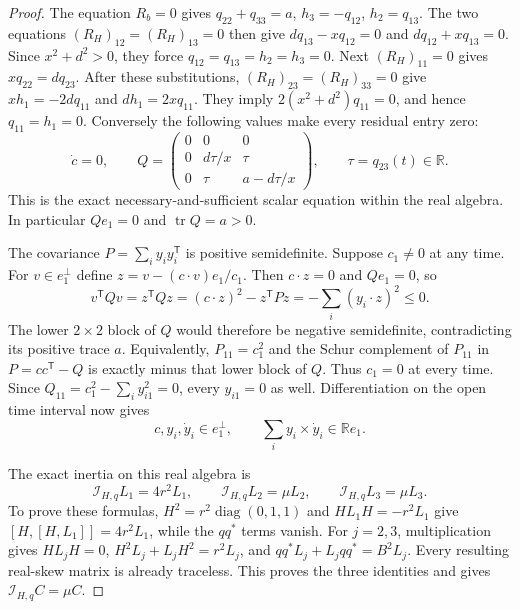 \begin{proof}
The equation $R_b=0$ gives $q_{22}+q_{33}=a$, $h_3=-q_{12}$,
$h_2=q_{13}$. The two equations $(R_H)_{12}=(R_H)_{13}=0$ then give
$dq_{13}-xq_{12}=0$ and $dq_{12}+xq_{13}=0$.
Since $x^2+d^2>0$, they force
$q_{12}=q_{13}=h_2=h_3=0$.
Next $(R_H)_{11}=0$ gives $xq_{22}=dq_{23}$.
After these substitutions, $(R_H)_{23}=(R_H)_{33}=0$ give
$xh_1=-2dq_{11}$ and $dh_1=2xq_{11}$.
They imply $2(x^2+d^2)q_{11}=0$, and hence $q_{11}=h_1=0$.
Conversely the following values make every residual entry zero:
\begin{equation}\label{q444:real-scalar-covariance}
 \dot c=0,\qquad Q=
 \begin{pmatrix}0&0&0\\0&d\tau/x&\tau\\0&\tau&a-d\tau/x\end{pmatrix},
 \qquad \tau=q_{23}(t)\in\mathbb R.
\end{equation}
This is the exact necessary-and-sufficient scalar equation within the
real algebra. In particular $Qe_1=0$ and $\operatorname{tr}Q=a>0$.

The covariance $P=\sum_i y_iy_i^{\mathsf T}$ is positive semidefinite.
Suppose $c_1\ne0$ at any time. For $v\in e_1^\perp$ define
$z=v-(c\cdot v)e_1/c_1$. Then $c\cdot z=0$ and $Qe_1=0$, so
\[
 v^{\mathsf T}Qv=z^{\mathsf T}Qz
 =(c\cdot z)^2-z^{\mathsf T}Pz
 =-\sum_i(y_i\cdot z)^2\leq0.
\]
The lower $2\times2$ block of $Q$ would therefore be negative
semidefinite, contradicting its positive trace $a$.
Equivalently, $P_{11}=c_1^2$ and the Schur complement of $P_{11}$ in
$P=cc^{\mathsf T}-Q$ is exactly minus that lower block of $Q$.
Thus $c_1=0$ at every time. Since
$Q_{11}=c_1^2-\sum_i y_{i1}^2=0$, every $y_{i1}=0$ as well.
Differentiation on the open time interval now gives
\[
 c,y_i,\dot y_i\in e_1^\perp,\qquad
 \sum_i y_i\times\dot y_i\in\mathbb R e_1.
\]

The exact inertia on this real algebra is
\[
 \mathscr I_{H,q}L_1=4r^2L_1,\qquad
 \mathscr I_{H,q}L_2=\mu L_2,\qquad
 \mathscr I_{H,q}L_3=\mu L_3.
\]
To prove these formulas, $H^2=r^2\operatorname{diag}(0,1,1)$ and
$HL_1H=-r^2L_1$ give
$[H,[H,L_1]]=4r^2L_1$, while the $qq^*$ terms vanish.
For $j=2,3$, multiplication gives $HL_jH=0$,
$H^2L_j+L_jH^2=r^2L_j$, and
$qq^*L_j+L_jqq^*=B^2L_j$.
Every resulting real-skew matrix is already traceless. This proves the
three identities and gives $\mathscr I_{H,q}C=\mu C$.


\end{proof}
